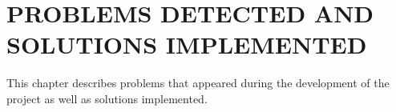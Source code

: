 \section{PROBLEMS DETECTED AND SOLUTIONS IMPLEMENTED}
\label{problems}
This chapter describes problems that appeared during the development of the project as well as solutions implemented.